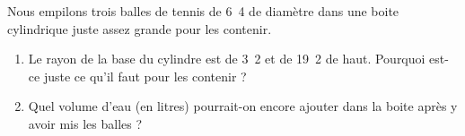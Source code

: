 
\begin{exercice}\label{exosmath-0113}

    Nous empilons trois balles de tennis de \unit{6.4}{\centi\meter} de diamètre dans une boite cylindrique juste assez grande pour les contenir.
    \begin{enumerate}
        \item
            Le rayon de la base du cylindre est de \unit{3.2}{\centi\meter} et de \unit{19.2}{\centi\meter} de haut. Pourquoi est-ce juste ce qu'il faut pour les contenir ?
        \item
            Quel volume d'eau (en litres) pourrait-on encore ajouter dans la boite après y avoir mis les balles ?
    \end{enumerate}

\end{exercice}
